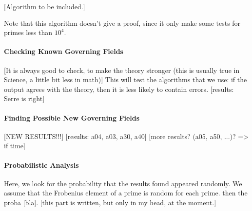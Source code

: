[Algorithm to be included.]


Note that this algorithm doesn't give a proof, since it only make some tests for primes less than $10^4$.

\paragraph{Checking Known Governing Fields}
[It is always good to check, to make the theory stronger (this is usually true in Science, a little bit less in math)]
This will test the algorithms that we use: if the output agrees with the theory, then it is less likely to contain errors.
[results: Serre is right]

\paragraph{Finding Possible New Governing Fields}
[NEW RESULTS!!!]
[results: a04, a03, a30, a40]
[more results? (a05, a50, ...)? => if time]


\paragraph{Probabilistic Analysis}
Here, we look for the probability that the results found appeared randomly.
We assume that the Frobenius element of a prime is random for each prime.
then the proba [bla].
[this part is written, but only in my head, at the moment.]



